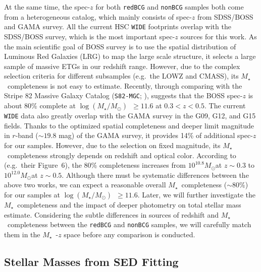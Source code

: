 \documentclass[preprint]{aastex}
\def\msun{$M_\odot$}
\def\logms{{$\log (M_{\star}/M_{\odot})$}~}
\def\mstar{{$M_{\star}$}~}
\begin{document}
\begin{CJK*}{UTF8}{gbsn}
    At the same time, the spec-$z$ for both \texttt{redBCG} and \texttt{nonBCG} samples
    both come from a heterogeneous catalog, which mainly consists of spec-$z$ from 
    SDSS/BOSS and GAMA survey. 
    All the current HSC \texttt{WIDE} footprints overlap with the SDSS/BOSS survey, 
    which is the most important spec-$z$ sources for this work.  
    As the main scientific goal of BOSS survey is to use the spatial distribution of
    Luminous Red Galaxies (LRG) to map the large scale structure, it selects a large
    sample of massive ETGs in our redshift range.  
    However, due to the complex selection criteria for different subsamples (e.g.\ 
    the LOWZ and CMASS), its \mstar completeness is not easy to estimate.  
    Recently, through comparing with the Stripe 82 Massive Galaxy Catalog
    (\texttt{S82-MGC}; \citealt{Bundy2015}), \citet{Leauthaud2016} suggests that the 
    BOSS spec-$z$ is about 80\% complete at \logms$\geq 11.6$ at $0.3 < z < 0.5$. 
    The current \texttt{WIDE} data also greatly overlap with the GAMA survey in the
    G09, G12, and G15 fields. 
    Thanks to the optimized spatial completeness and deeper limit magnitude in 
    $r$-band ($\sim 19.8$ mag) of the GAMA survey, it provides 14\% of additional
    spec-$z$ for our samples.  
    However, due to the selection on fixed magnitude, its \mstar completeness 
    strongly depends on redshift and optical color.  
    According to \citet{Taylor2011} (e.g.\ their Figure~6), the 80\% completeness 
    increases from $10^{10.8}$\msun at $z\sim 0.3$ to $10^{12.0}$\msun at $z\sim 0.5$.
    Although there must be systematic differences between the above two works, 
    we can expect a reasonable overall \mstar completeness ($\sim 80$\%) for our 
    samples at \logms$\geq 11.6$.  
    Later, we will further investigate the \mstar completeness and the impact of deeper
    photometry on total stellar mass estimate. 
    Considering the subtle differences in sources of redshift and \mstar completeness   
    between the \texttt{redBCG} and \texttt{nonBCG} samples, we will carefully 
    match them in the \mstar-$z$ space before any comparison is conducted.    

\subsection{Stellar Masses from SED Fitting}


\end{CJK*}
\end{document}
